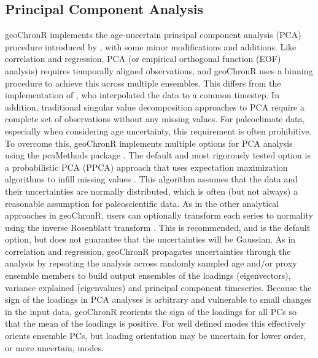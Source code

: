 \documentclass[gchron, manuscript]{copernicus}
\begin{document}
\subsection{Principal Component Analysis}

geoChronR implements the age-uncertain principal component analysis
(PCA) procedure introduced by \citet{anchukaitis2013mceof}, with some
minor modifications and additions. Like correlation and regression, PCA
(or empirical orthogonal function (EOF) analysis) requires temporally
aligned observations, and geoChronR uses a binning procedure to achieve
this across multiple ensembles. This differs from the implementation of
\citet{anchukaitis2013mceof}, who interpolated the data to a common
timestep. In addition, traditional singular value decomposition
approaches to PCA require a complete set of observations without any
missing values. For paleoclimate data, especially when considering age
uncertainty, this requirement is often prohibitive. To overcome this,
geoChronR implements multiple options for PCA analysis using the
pcaMethods package \citep{pcaMethods}. The default and most rigorously
tested option is a probabilistic PCA (PPCA) approach that uses
expectation maximization algorithms to infill missing values
\citep{roweis1998algorithms}. This algorithm assumes that the data and
their uncertainties are normally distributed, which is often (but not
always) a reasonable assumption for paleoscientific data. As in the
other analytical approaches in geoChronR, users can optionally transform
each series to normality using the inverse Rosenblatt transform
\citep{vanAlbada2007}. This is recommended, and is the default option,
but does not guarantee that the uncertainties will be Gaussian. As in
correlation and regression, geoChronR propagates uncertainties through
the analysis by repeating the analysis across randomly sampled age
and/or proxy ensemble members to build output ensembles of the loadings
(eigenvectors), variance explained (eigenvalues) and principal component
timeseries. Because the sign of the loadings in PCA analyses is
arbitrary and vulnerable to small changes in the input data, geoChronR
reorients the sign of the loadings for all PCs so that the mean of the
loadings is positive. For well defined modes this effectively orients
ensemble PCs, but loading orientation may be uncertain for lower order,
or more uncertain, modes.
\end{document}
